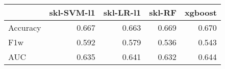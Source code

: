 \begin{tabular}{lrrrr}
\toprule
{} &  skl-SVM-l1 &  skl-LR-l1 &  skl-RF &  xgboost \\
\midrule
Accuracy &       0.667 &      0.663 &   0.669 &    0.670 \\
F1w      &       0.592 &      0.579 &   0.536 &    0.543 \\
AUC      &       0.635 &      0.641 &   0.632 &    0.644 \\
\bottomrule
\end{tabular}
